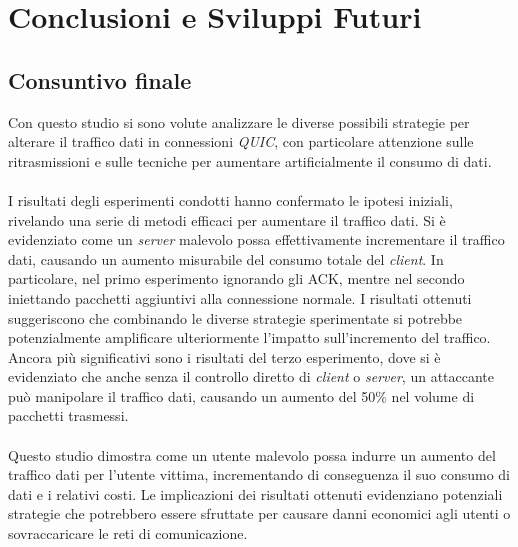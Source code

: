 \chapter{Conclusioni e Sviluppi Futuri}
\label{cap:conclusioni}

\section{Consuntivo finale}
Con questo studio si sono volute analizzare le diverse possibili strategie per alterare il traffico dati in connessioni \emph{QUIC},
con particolare attenzione sulle ritrasmissioni e sulle tecniche per aumentare artificialmente il consumo di dati.
\\\\
I risultati degli esperimenti condotti hanno confermato le ipotesi iniziali, rivelando una serie di metodi efficaci per aumentare il traffico dati. 
Si è evidenziato come un \emph{server} malevolo possa effettivamente incrementare il traffico dati, causando un aumento misurabile del consumo totale del \emph{client}.
In particolare, nel primo esperimento ignorando gli ACK, mentre nel secondo iniettando pacchetti aggiuntivi alla connessione normale. 
I risultati ottenuti suggeriscono che combinando le diverse strategie sperimentate si
potrebbe potenzialmente amplificare ulteriormente l'impatto sull'incremento del traffico. 
Ancora più significativi sono i risultati del terzo esperimento, dove si è evidenziato che anche senza il controllo diretto di \emph{client} o \emph{server}, 
un attaccante può manipolare il traffico dati, causando un aumento del 50\% nel volume di pacchetti trasmessi.
\\\\
Questo studio dimostra come un utente malevolo possa indurre un aumento del traffico dati per l'utente vittima, incrementando di conseguenza il suo consumo di dati e i relativi costi.
Le implicazioni dei risultati ottenuti evidenziano potenziali strategie che potrebbero essere sfruttate per causare danni economici agli utenti o sovraccaricare le reti di comunicazione.
